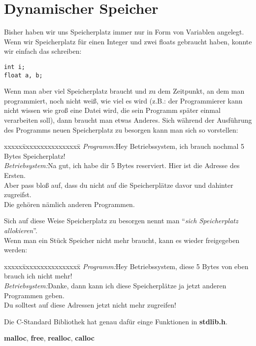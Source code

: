 \documentclass[c_worksheet.tex]{subfiles}
\begin{document}
  
\chapter{Dynamischer Speicher}

Bisher haben wir uns Speicherplatz immer nur in Form von Variablen angelegt. Wenn wir Speicherplatz für einen Integer und zwei floats gebraucht haben, konnte wir einfach das schreiben:
\begin{lstlisting}[numbers=none]
int i;
float a, b;
\end{lstlisting}

Wenn man aber viel Speicherplatz braucht und zu dem Zeitpunkt, an dem man programmiert, noch nicht weiß, wie viel es wird (z.B.: der Programmierer kann nicht wissen wie groß eine Datei wird, die sein Programm später einmal verarbeiten soll), dann braucht man etwas Anderes. Sich während der Ausführung des Programms neuen Speicherplatz zu besorgen kann man sich so vorstellen:
\begin{tabbing}
xxxxx\=xxxxxxxxxxxxxxxx\= \kill
\>\textit{Programm:}\>Hey Betriebssystem, ich brauch nochmal 5 Bytes Speicherplatz! \\
\>\textit{Betriebsystem:}\>Na gut, ich habe dir 5 Bytes reserviert. Hier ist die Adresse des Ersten.\\
\>\>Aber pass bloß auf, dass du nicht auf die Speicherplätze davor und dahinter zugreifst.\\
\>\>Die gehören nämlich anderen Programmen.
\end{tabbing}

Sich auf diese Weise Speicherplatz zu besorgen nennt man ``\textit{sich Speicherplatz allokieren}''.\\
Wenn man ein Stück Speicher nicht mehr braucht, kann es wieder freigegeben werden:
\begin{tabbing}
xxxxx\=xxxxxxxxxxxxxxxx\= \kill
\>\textit{Programm:}\>Hey Betriebssystem, diese 5 Bytes von eben brauch ich nicht mehr! \\
\>\textit{Betriebsystem:}\>Danke, dann kann ich diese Speicherplätze ja jetzt anderen Programmen geben.\\
\>\>Du solltest auf diese Adressen jetzt nicht mehr zugreifen!
\end{tabbing}

\vspace{5pt}
Die C-Standard Bibliothek hat genau dafür einge Funktionen in \textbf{stdlib.h}.\\
\begin{center}
\textbf{malloc}, \textbf{free}, \textbf{realloc}, \textbf{calloc}
\end{center}
\end{document}
